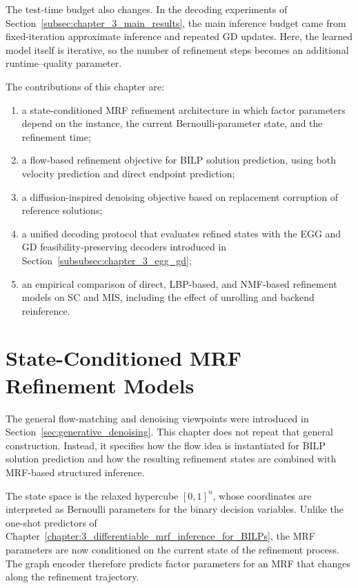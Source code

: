 The test-time budget also changes. In the decoding experiments of Section~\ref{subsec:chapter_3_main_results}, the main inference budget came from fixed-iteration approximate inference and repeated GD updates. Here, the learned model itself is iterative, so the number of refinement steps becomes an additional runtime--quality parameter.

The contributions of this chapter are:
\begin{enumerate}
    \item a state-conditioned MRF refinement architecture in which factor parameters depend on the instance, the current Bernoulli-parameter state, and the refinement time;

    \item a flow-based refinement objective for BILP solution prediction, using both velocity prediction and direct endpoint prediction;

    \item a diffusion-inspired denoising objective based on replacement corruption of reference solutions;

    \item a unified decoding protocol that evaluates refined states with the EGG and GD feasibility-preserving decoders introduced in Section~\ref{subsubsec:chapter_3_egg_gd};

    \item an empirical comparison of direct, LBP-based, and NMF-based refinement models on SC and MIS, including the effect of unrolling and backend reinference.
\end{enumerate}

\section{State-Conditioned MRF Refinement Models}
\label{sec:state_conditioned_mrf_refinement}

The general flow-matching and denoising viewpoints were introduced in Section~\ref{sec:generative_denoising}. This chapter does not repeat that general construction. Instead, it specifies how the flow idea is instantiated for BILP solution prediction and how the resulting refinement states are combined with MRF-based structured inference.

The state space is the relaxed hypercube $[0,1]^n$, whose coordinates are interpreted as Bernoulli parameters for the binary decision variables. Unlike the one-shot predictors of Chapter~\ref{chapter:3_differentiable_mrf_inference_for_BILPs}, the MRF parameters are now conditioned on the current state of the refinement process. The graph encoder therefore predicts factor parameters for an MRF that changes along the refinement trajectory.

